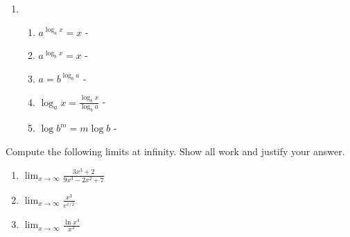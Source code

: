 \documentclass[9pt]{article}
\begin{document}
\begin {enumerate}
\begin {enumerate}
				$ 10^{\log_{10} \left(\frac{x+3}{x}\right)} = 10^1 $ \hfill(Raise each side as the exponent to 10)\\
				$  \frac{x+3}{x} = 10$ \hfill (Simplify)\\
				$  x + 3 = 10x $ \hfill (Multiply both sides by $x$)\\
				$ 3 = 10x - x $ \hfill (Subtract $x$ from both sides)\\
				$ 3 = 9x $ \hfill (Simplify)\\ 
				 \hfill (Divide both sides by 9)
		\end{enumerate}
		\newpage
	\item 
		\begin {enumerate}
			\item $ a^{\log_a x} = x $ - 
			\item $ a^{\log_b x} = x $ - 
			\item $ a = b^{\log_b a} $ - 
			\item $\log_a x = \frac{\log_b x}{\log_b a} $ - 
			\item $\log b^m = m \log b $ - 
		\end{enumerate}
\end{enumerate}

\fi

\newpage




\vspace{5mm}

\item Compute the following limits at infinity. Show all work and justify your answer.

\begin{enumerate}
\item $ \displaystyle \lim_{x \to \infty} \frac{3x^3 + 2}{9x^3 - 2x^2 +7} $
\item $ \displaystyle \lim_{x \to \infty} \frac{x^3}{e^{x/2}} $
\item $ \displaystyle \lim_{x \to \infty} \frac{\ln x^4}{x^3} $
\end{enumerate}
\end{document}
